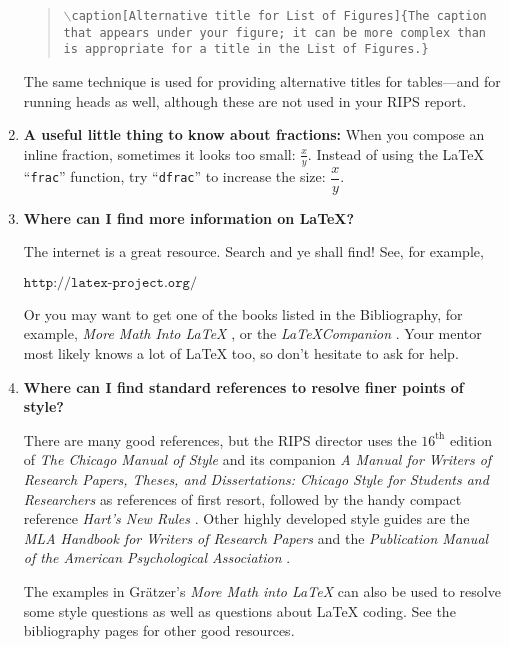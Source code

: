 \begin{enumerate}
\begin{quote}
{\tt $\backslash$caption[Alternative title for List of Figures]\{The caption that appears under your figure; it can be more complex than is appropriate for a title in the List of Figures.\}}
\end{quote}

The same technique is used for providing alternative titles for tables---and for running heads as well, although these are not used in your RIPS report.

\item {\bf A useful little thing to know about fractions:} When you compose an inline fraction, sometimes it looks too small: $\frac{x}{y}$.  Instead of using the {\LaTeX} ``\texttt{frac}'' function, try ``\texttt{dfrac}'' to increase the size: $\dfrac{x}{y}$.

\item {\bf Where can I find more information on {\LaTeX}?}

The internet is a great resource.  Search and ye shall find! See, for example,\\

\centerline{$\texttt{http://latex-project.org/}$}
\vspace{5pt}

\hspace{15pt}Or you may want to get one of the books listed  in the Bibliography, for example, \emph{More Math Into {\LaTeX}} \cite{gratzer}, or the \emph{{\LaTeX}Companion} \cite{Mittelbach}.
Your mentor most likely knows a lot of {\LaTeX} too, so don't hesitate to ask for help.

\item {\bf Where can I find standard references to resolve finer points of style?}

There are many good references, but the RIPS director uses the $16^{\text{th}}$ edition of \emph{The Chicago Manual of Style} \cite{Chicago-Manual} and its companion \emph{A Manual for Writers of Research Papers, Theses, and Dissertations: Chicago Style for Students and Researchers} \cite{Turabian} as  references of first resort, followed by the handy compact reference \emph{Hart's New Rules} \cite{NewHartRules}.
Other highly developed style guides are the \emph{MLA Handbook for Writers of Research Papers} \cite{MLAHandbook} and the \emph{Publication Manual of the American Psychological Association} \cite{APA}.

\hspace{15pt}The examples in Gr\"{a}tzer's \emph{More Math into {LaTeX}} \cite{gratzer} can also be used to resolve some style questions as well as questions about {\LaTeX} coding.
See the bibliography pages for other good resources.


\end{enumerate}
